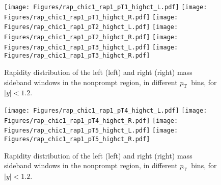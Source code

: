 \documentclass[12pt]{article}
\newcommand{\pt}{$p_{\mathrm{T}}$}
\begin{document}
\begin{figure}[htbp]
\centering
\texttt{[image: Figures/rap\_chic1\_rap1\_pT1\_highct\_L.pdf]}
\texttt{[image: Figures/rap\_chic1\_rap1\_pT1\_highct\_R.pdf]}
\texttt{[image: Figures/rap\_chic1\_rap1\_pT2\_highct\_L.pdf]}
\texttt{[image: Figures/rap\_chic1\_rap1\_pT2\_highct\_R.pdf]}
\texttt{[image: Figures/rap\_chic1\_rap1\_pT3\_highct\_L.pdf]}
\texttt{[image: Figures/rap\_chic1\_rap1\_pT3\_highct\_R.pdf]}
\caption{Rapidity distribution of the left (left) and
  right (right) mass sideband windows in the nonprompt region, in
  different
  \pt\ bins, for $|y| < 1.2$.}
\end{figure}
\clearpage

\begin{figure}[htbp]
\centering
\texttt{[image: Figures/rap\_chic1\_rap1\_pT4\_highct\_L.pdf]}
\texttt{[image: Figures/rap\_chic1\_rap1\_pT4\_highct\_R.pdf]}
\texttt{[image: Figures/rap\_chic1\_rap1\_pT5\_highct\_L.pdf]}
\texttt{[image: Figures/rap\_chic1\_rap1\_pT5\_highct\_R.pdf]}
\caption{Rapidity distribution of the left (left) and
  right (right) mass sideband windows in the nonprompt region, in
  different
  \pt\ bins, for $|y| < 1.2$.}
\end{figure}
\clearpage
\end{document}
